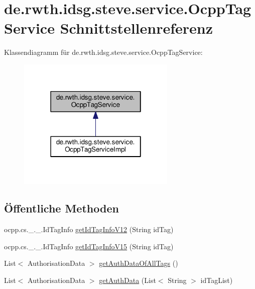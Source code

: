 \hypertarget{interfacede_1_1rwth_1_1idsg_1_1steve_1_1service_1_1_ocpp_tag_service}{\section{de.\+rwth.\+idsg.\+steve.\+service.\+Ocpp\+Tag\+Service Schnittstellenreferenz}
\label{interfacede_1_1rwth_1_1idsg_1_1steve_1_1service_1_1_ocpp_tag_service}
}


Klassendiagramm für de.\+rwth.\+idsg.\+steve.\+service.\+Ocpp\+Tag\+Service\+:\nopagebreak
\begin{figure}[H]
\begin{center}
\leavevmode
\includegraphics[width=214pt]{interfacede_1_1rwth_1_1idsg_1_1steve_1_1service_1_1_ocpp_tag_service__inherit__graph}
\end{center}
\end{figure}
\subsection*{Öffentliche Methoden}
\begin{DoxyCompactItemize}
\item 
ocpp.\+cs.\+\_.\+\_.\+Id\+Tag\+Info \hyperlink{interfacede_1_1rwth_1_1idsg_1_1steve_1_1service_1_1_ocpp_tag_service_a77807256b6d913830669edcc46ec028f}{get\+Id\+Tag\+Info\+V12} (String id\+Tag)
\item 
ocpp.\+cs.\+\_.\+\_.\+Id\+Tag\+Info \hyperlink{interfacede_1_1rwth_1_1idsg_1_1steve_1_1service_1_1_ocpp_tag_service_afe5afe05ed4f072302ed4ed7622dba76}{get\+Id\+Tag\+Info\+V15} (String id\+Tag)
\item 
List$<$ Authorisation\+Data $>$ \hyperlink{interfacede_1_1rwth_1_1idsg_1_1steve_1_1service_1_1_ocpp_tag_service_a669a739e1cbf6aeeacc4ffcb3375991b}{get\+Auth\+Data\+Of\+All\+Tags} ()
\item 
List$<$ Authorisation\+Data $>$ \hyperlink{interfacede_1_1rwth_1_1idsg_1_1steve_1_1service_1_1_ocpp_tag_service_a33a7a5cf778ddd247bab73e5c9f80551}{get\+Auth\+Data} (List$<$ String $>$ id\+Tag\+List)
\end{DoxyCompactItemize}


